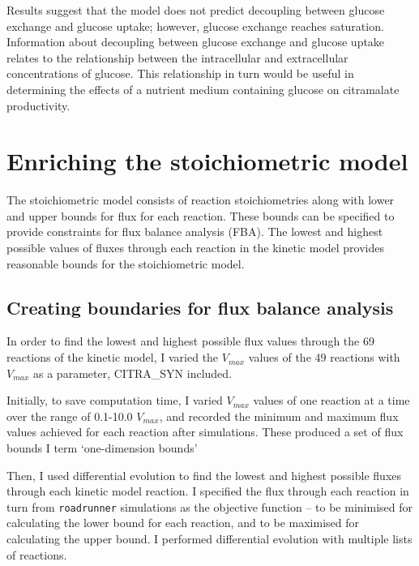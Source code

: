 \documentclass[parskip=full, numbers=noenddot]{scrreprt}
\begin{document}
Results suggest that the model does not predict decoupling between glucose exchange and glucose uptake; however, glucose exchange reaches saturation.
Information about decoupling between glucose exchange and glucose uptake relates to the relationship between the intracellular and extracellular concentrations of glucose. This relationship in turn would be useful in determining the effects of a nutrient medium containing glucose on citramalate productivity.

\chapter{Enriching the stoichiometric model}
\label{ch:stoich}

The stoichiometric model consists of reaction stoichiometries along with lower and upper bounds for flux for each reaction. These bounds can be specified to provide constraints for flux balance analysis (FBA).%
The lowest and highest possible values of fluxes through each reaction in the kinetic model provides reasonable bounds for the stoichiometric model.

\section{Creating boundaries for flux balance analysis}
\label{sec:bounds}

In order to find the lowest and highest possible flux values through the 69 reactions of the kinetic model, I varied the $V_{max}$ values of the 49 reactions with $V_{max}$ as a parameter, CITRA\_SYN included.

Initially, to save computation time, I varied $V_{max}$ values of one reaction at a time over the range of 0.1-10.0 $V_{max}$, and recorded the minimum and maximum flux values achieved for each reaction after simulations. These produced a set of flux bounds I term `one-dimension bounds'

Then, I used differential evolution to find the lowest and highest possible fluxes through each kinetic model reaction. I specified the flux through each reaction in turn from \texttt{roadrunner} simulations as the objective function -- to be minimised for calculating the lower bound for each reaction, and to be maximised for calculating the upper bound. I performed differential evolution with multiple lists of reactions.
\end{document}

